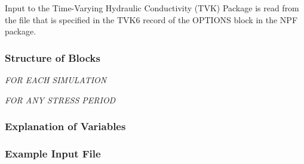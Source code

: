 Input to the Time-Varying Hydraulic Conductivity (TVK) Package is read from the file that is specified in the TVK6 record of the OPTIONS block in the NPF package.

\vspace{5mm}
\subsubsection{Structure of Blocks}
\vspace{5mm}

\noindent \textit{FOR EACH SIMULATION}

\vspace{5mm}
\noindent \textit{FOR ANY STRESS PERIOD}


\vspace{5mm}
\subsubsection{Explanation of Variables}
\begin{description}

\end{description}

\vspace{5mm}
\subsubsection{Example Input File}

